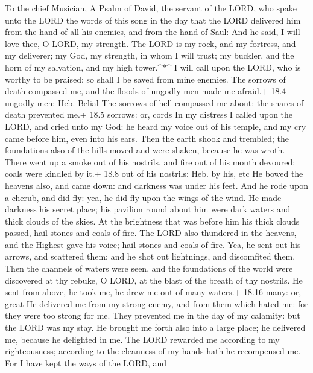 To the chief Musician, A Psalm of David, the servant of the LORD, who
spake unto the LORD the words of this song in the day that the LORD
delivered him from the hand of all his enemies, and from the hand of
Saul: And he said,  I will love thee, O LORD, my strength.
 The LORD is my rock, and my fortress, and my deliverer; my
God, my strength, in whom I will trust; my buckler, and the horn of my
salvation, and my high tower.\^{}*\^{}  I will call upon the
LORD, who is worthy to be praised: so shall I be saved from mine
enemies.  The sorrows of death compassed me, and the floods
of ungodly men made me afraid.+ 18.4 ungodly men: Heb. Belial
 The sorrows of hell compassed me about: the snares of death
prevented me.+ 18.5 sorrows: or, cords  In my distress I
called upon the LORD, and cried unto my God: he heard my voice out of
his temple, and my cry came before him, even into his ears. 
Then the earth shook and trembled; the foundations also of the hills
moved and were shaken, because he was wroth.  There went up
a smoke out of his nostrils, and fire out of his mouth devoured: coals
were kindled by it.+ 18.8 out of his nostrils: Heb. by his, etc
 He bowed the heavens also, and came down: and darkness was
under his feet.  And he rode upon a cherub, and did fly:
yea, he did fly upon the wings of the wind.  He made
darkness his secret place; his pavilion round about him were dark waters
and thick clouds of the skies.  At the brightness that was
before him his thick clouds passed, hail stones and coals of fire.
 The LORD also thundered in the heavens, and the Highest
gave his voice; hail stones and coals of fire.  Yea, he
sent out his arrows, and scattered them; and he shot out lightnings, and
discomfited them.  Then the channels of waters were seen,
and the foundations of the world were discovered at thy rebuke, O LORD,
at the blast of the breath of thy nostrils.  He sent from
above, he took me, he drew me out of many waters.+ 18.16 many: or, great
 He delivered me from my strong enemy, and from them which
hated me: for they were too strong for me.  They prevented
me in the day of my calamity: but the LORD was my stay.  He
brought me forth also into a large place; he delivered me, because he
delighted in me.  The LORD rewarded me according to my
righteousness; according to the cleanness of my hands hath he
recompensed me.  For I have kept the ways of the LORD, and
